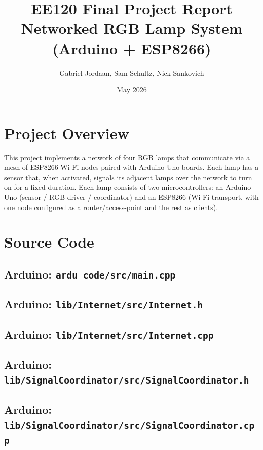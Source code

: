 \documentclass[11pt]{article}
\title{EE120 Final Project Report \\
       \large Networked RGB Lamp System (Arduino + ESP8266)}
\author{Gabriel Jordaan, Sam Schultz, Nick Sankovich}
\date{May 2026}
\begin{document}
\maketitle

\section{Project Overview}

This project implements a network of four RGB lamps that communicate via a
mesh of ESP8266 Wi-Fi nodes paired with Arduino Uno boards. Each lamp has a
sensor that, when activated, signals its adjacent lamps over the network to
turn on for a fixed duration. Each lamp consists of two microcontrollers:
an Arduino Uno (sensor / RGB driver / coordinator) and an ESP8266 (Wi-Fi
transport, with one node configured as a router/access-point and the rest as
clients).

\section{Source Code}

\subsection{Arduino: \texttt{ardu code/src/main.cpp}}


\subsection{Arduino: \texttt{lib/Internet/src/Internet.h}}


\subsection{Arduino: \texttt{lib/Internet/src/Internet.cpp}}


\subsection{Arduino: \texttt{lib/SignalCoordinator/src/SignalCoordinator.h}}


\subsection{Arduino: \texttt{lib/SignalCoordinator/src/SignalCoordinator.cpp}}

\end{document}
